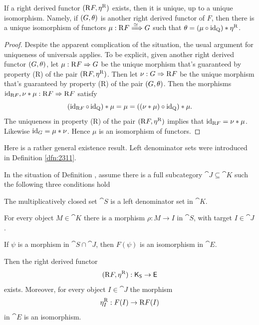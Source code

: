 \begin{prop} \label{prop:1975}
If a right derived functor $(\mathrm{R} F, \eta^{\mathrm{R}})$ exists, then it is
unique, up to a unique isomorphism. Namely, if  $(G, \theta)$ is another right 
derived functor of $F$, then there is a unique isomorphism of functors 
$\mu : \mathrm{R} F \stackrel{\simeq\ }{\Longrightarrow} G$ such that 
$\theta = (\mu \circ \operatorname{id}_{\operatorname{Q}}) * \eta^{\mathrm{R}}$.
\end{prop}

\begin{proof}
Despite the apparent complication of the situation, the usual argument for 
uniqueness of universals applies. 
To be explicit, given another right derived functor $(G, \theta)$, let 
$\mu : \mathrm{R} F \Rightarrow G$
be the unique morphism that's guaranteed by property (R) of the pair 
$(\mathrm{R} F, \eta^{\mathrm{R}})$. Then let 
$\nu : G \Rightarrow \mathrm{R} F$ be the unique morphism that's guaranteed by 
property (R) of the pair $(G, \theta)$. Then the morphisms 
$\operatorname{id}_{\mathrm{R} F}, \nu * \mu : \mathrm{R} F \Rightarrow \mathrm{R} F$ 
satisfy 
\[ (\operatorname{id}_{\mathrm{R} F} \circ \operatorname{id}_{\operatorname{Q}}) * \mu = \mu = 
((\nu * \mu) \circ \operatorname{id}_{\operatorname{Q}}) * \mu . \]
The uniqueness in property (R) of the pair $(\mathrm{R} F, \eta^{\mathrm{R}})$
implies that 
$\operatorname{id}_{\mathrm{R} F} = \nu * \mu$. Likewise 
$\operatorname{id}_{G} = \mu * \nu$. 
Hence $\mu$ is an isomorphism of functors. 
\end{proof}

Here is a rather general existence result. 
Left denominator sets were introduced in Definition \ref{dfn:2311}. 

\begin{thm} \label{thm:2080}
In the situation of Definition \tup{\ref{dfn:2080}}, 
assume there is a full subcategory $\cat{J} \subseteq \cat{K}$
such the following three conditions hold\tup{:}
\begin{enumerate}
 The multiplicatively closed set $\cat{S}$ 
is a left denominator set in $\cat{K}$. 

 For every object $M \in \cat{K}$ there is a morphism 
$\rho : M \to I$ in $\cat{S}$, with target $I \in \cat{J}$. 

 If $\psi$ is a morphism in $\cat{S} \cap \cat{J}$, then 
$F(\psi)$ is an isomorphism in $\cat{E}$.
\end{enumerate}
Then the right derived functor
\[ (\mathrm{R} F, \eta^{\mathrm{R}}) : \operatorname{\mathsf{K}}_{\operatorname{\mathsf{S}}} \to \operatorname{\mathsf{E}} \]
exists. Moreover, for every object $I \in \cat{J}$ the morphism  
\[ \eta^{\mathrm{R}}_{I} : F(I) \to \mathrm{R} F(I) \]
in $\cat{E}$ is an isomorphism.
\end{thm}

